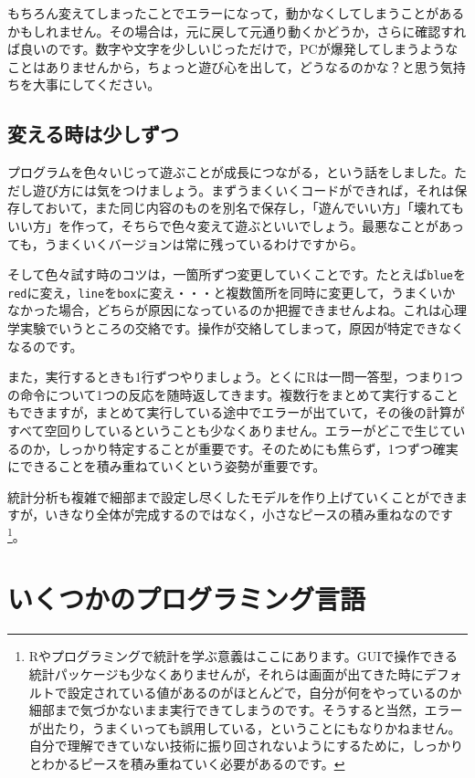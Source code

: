 \documentclass{ltjsbook}
\begin{document}
もちろん変えてしまったことでエラーになって，動かなくしてしまうことがあるかもしれません。その場合は，元に戻して元通り動くかどうか，さらに確認すれば良いのです。数字や文字を少しいじっただけで，PCが爆発してしまうようなことはありませんから，ちょっと遊び心を出して，どうなるのかな？と思う気持ちを大事にしてください。

\subsection{変える時は少しずつ}
プログラムを色々いじって遊ぶことが成長につながる，という話をしました。ただし遊び方には気をつけましょう。まずうまくいくコードができれば，それは保存しておいて，また同じ内容のものを別名で保存し，「遊んでいい方」「壊れてもいい方」を作って，そちらで色々変えて遊ぶといいでしょう。最悪なことがあっても，うまくいくバージョンは常に残っているわけですから。

そして色々試す時のコツは，一箇所ずつ変更していくことです。たとえば\texttt{blue}を\texttt{red}に変え，\texttt{line}を\texttt{box}に変え・・・と複数箇所を同時に変更して，うまくいかなかった場合，どちらが原因になっているのか把握できませんよね。これは心理学実験でいうところの交絡です。操作が交絡してしまって，原因が特定できなくなるのです。

また，実行するときも1行ずつやりましょう。とくにRは一問一答型，つまり1つの命令について1つの反応を随時返してきます。複数行をまとめて実行することもできますが，まとめて実行している途中でエラーが出ていて，その後の計算がすべて空回りしているということも少なくありません。エラーがどこで生じているのか，しっかり特定することが重要です。そのためにも焦らず，1つずつ確実にできることを積み重ねていくという姿勢が重要です。

統計分析も複雑で細部まで設定し尽くしたモデルを作り上げていくことができますが，いきなり全体が完成するのではなく，小さなピースの積み重ねなのです\footnote{Rやプログラミングで統計を学ぶ意義はここにあります。GUIで操作できる統計パッケージも少なくありませんが，それらは画面が出てきた時にデフォルトで設定されている値があるのがほとんどで，自分が何をやっているのか細部まで気づかないまま実行できてしまうのです。そうすると当然，エラーが出たり，うまくいっても誤用している，ということにもなりかねません。自分で理解できていない技術に振り回されないようにするために，しっかりとわかるピースを積み重ねていく必要があるのです。}。

\section{いくつかのプログラミング言語}
\end{document}
